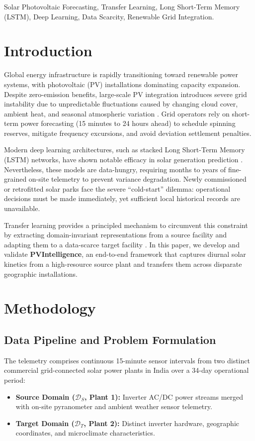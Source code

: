 \documentclass[conference]{IEEEtran}
\begin{document}
\begin{IEEEkeywords}
Solar Photovoltaic Forecasting, Transfer Learning, Long Short-Term Memory (LSTM), Deep Learning, Data Scarcity, Renewable Grid Integration.
\end{IEEEkeywords}

\section{Introduction}
Global energy infrastructure is rapidly transitioning toward renewable power systems, with photovoltaic (PV) installations dominating capacity expansion. Despite zero-emission benefits, large-scale PV integration introduces severe grid instability due to unpredictable fluctuations caused by changing cloud cover, ambient heat, and seasonal atmospheric variation \cite{yang2018}. Grid operators rely on short-term power forecasting (15 minutes to 24 hours ahead) to schedule spinning reserves, mitigate frequency excursions, and avoid deviation settlement penalties.

Modern deep learning architectures, such as stacked Long Short-Term Memory (LSTM) networks, have shown notable efficacy in solar generation prediction \cite{pandith2024}. Nevertheless, these models are data-hungry, requiring months to years of fine-grained on-site telemetry to prevent variance degradation. Newly commissioned or retrofitted solar parks face the severe ``cold-start'' dilemma: operational decisions must be made immediately, yet sufficient local historical records are unavailable.

Transfer learning provides a principled mechanism to circumvent this constraint by extracting domain-invariant representations from a source facility and adapting them to a data-scarce target facility \cite{pan2010, sarmas2022}. In this paper, we develop and validate \textbf{PVIntelligence}, an end-to-end framework that captures diurnal solar kinetics from a high-resource source plant and transfers them across disparate geographic installations.

\section{Methodology}

\subsection{Data Pipeline and Problem Formulation}
The telemetry comprises continuous 15-minute sensor intervals from two distinct commercial grid-connected solar power plants in India over a 34-day operational period:
\begin{itemize}
    \item \textbf{Source Domain ($\mathcal{D}_S$, Plant 1):} Inverter AC/DC power streams merged with on-site pyranometer and ambient weather sensor telemetry.
    \item \textbf{Target Domain ($\mathcal{D}_T$, Plant 2):} Distinct inverter hardware, geographic coordinates, and microclimate characteristics.
\end{itemize}
\end{document}

